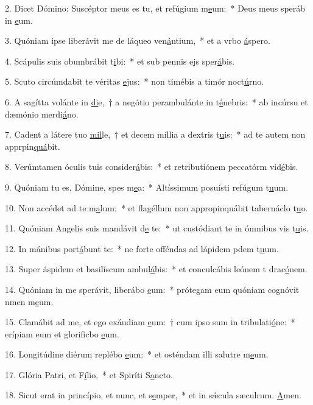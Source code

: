 2. Dicet Dómino: Suscéptor meus es tu, et refúgium m\uline{e}um:~* Deus meus speráb in \uline{e}um.\par 
3. Quóniam ipse liberávit me de láqueo ven\uline{á}ntium,~* et a vrbo \uline{á}spero.\par 
4. Scápulis suis obumbrábit t\uline{i}bi:~* et sub pennis ejs sper\uline{á}bis.\par 
5. Scuto circúmdabit te véritas \uline{e}jus:~* non timébis a timór noct\uline{ú}rno.\par 
6. A sagítta volánte in \uline{di}e,~† a negótio perambulánte in t\uline{é}nebris:~* ab incúrsu et dæmónio merdi\uline{á}no.\par 
7. Cadent a látere tuo \uline{mil}le,~† et decem míllia a dextris t\uline{u}is:~* ad te autem non apprpin\uline{quá}bit.\par 
8. Verúmtamen óculis tuis consider\uline{á}bis:~* et retributiónem peccatórm vid\uline{é}bis.\par 
9. Quóniam tu es, Dómine, spes m\uline{e}a:~* Altíssimum posuísti refúgum t\uline{u}um.\par 
10. Non accédet ad te m\uline{a}lum:~* et flagéllum non appropinquábit tabernáclo t\uline{u}o.\par 
11. Quóniam Angelis suis mandávit d\uline{e} te:~* ut custódiant te in ómnibus vis t\uline{u}is.\par 
12. In mánibus port\uline{á}bunt te:~* ne forte offéndas ad lápidem pdem t\uline{u}um.\par 
13. Super áspidem et basilíscum ambul\uline{á}bis:~* et conculcábis leónem t drac\uline{ó}nem.\par 
14. Quóniam in me sperávit, liberábo \uline{e}um:~* prótegam eum quóniam cognóvit nmen m\uline{e}um.\par 
15. Clamábit ad me, et ego exáudiam \uline{e}um:~† cum ipso sum in tribulati\uline{ó}ne:~* erípiam eum et glorificbo \uline{e}um.\par 
16. Longitúdine diérum replébo \uline{e}um:~* et osténdam illi salutre m\uline{e}um.\par 
17. Glória Patri, et F\uline{í}lio,~* et Spiríti S\uline{a}ncto.\par 
18. Sicut erat in princípio, et nunc, et s\uline{e}mper,~* et in sǽcula sæculrum. \uline{A}men.\par 

